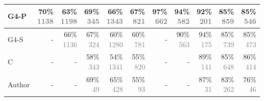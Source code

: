 \begin{table}[h]
\begin{subtable}[t]{\textwidth}
{\begin{tabular}[t]{lrrrrrrrrrr}
 G4-P & \shortstack{70\% \\ \textcolor{gray}{ 1138 }} & \shortstack{63\% \\ \textcolor{gray}{ 1198 }} & \shortstack{69\% \\ \textcolor{gray}{ 345 }} & \shortstack{66\% \\ \textcolor{gray}{ 1343 }} & \shortstack{67\% \\ \textcolor{gray}{ 821 }} & \shortstack{97\% \\ \textcolor{gray}{ 662 }} & \shortstack{94\% \\ \textcolor{gray}{ 582 }} & \shortstack{92\% \\ \textcolor{gray}{ 201 }} & \shortstack{85\% \\ \textcolor{gray}{ 859 }} & \shortstack{85\% \\ \textcolor{gray}{ 546 }}\\
 \midrule
G4-S & - & \shortstack{66\% \\ \textcolor{gray}{ 1136 }} & \shortstack{67\% \\ \textcolor{gray}{ 324 }} & \shortstack{60\% \\ \textcolor{gray}{ 1280 }} & \shortstack{60\% \\ \textcolor{gray}{ 781 }} & - & \shortstack{90\% \\ \textcolor{gray}{ 563 }} & \shortstack{94\% \\ \textcolor{gray}{ 175 }} & \shortstack{85\% \\ \textcolor{gray}{ 739 }} & \shortstack{85\% \\ \textcolor{gray}{ 473 }}\\
 \midrule
C & - & - & \shortstack{58\% \\ \textcolor{gray}{ 343 }} & \shortstack{54\% \\ \textcolor{gray}{ 1341 }} & \shortstack{55\% \\ \textcolor{gray}{ 820 }} & - & - & \shortstack{89\% \\ \textcolor{gray}{ 141 }} & \shortstack{85\% \\ \textcolor{gray}{ 648 }} & \shortstack{86\% \\ \textcolor{gray}{ 414 }}\\
 \midrule
Author & - & - & \shortstack{69\% \\ \textcolor{gray}{ 49 }} & \shortstack{65\% \\ \textcolor{gray}{ 428 }} & \shortstack{55\% \\ \textcolor{gray}{ 93 }} & - & - & \shortstack{87\% \\ \textcolor{gray}{ 31 }} & \shortstack{83\% \\ \textcolor{gray}{ 262 }} & \shortstack{76\% \\ \textcolor{gray}{ 46 }}\\

\end{tabular}}
\end{subtable}
\end{table}
